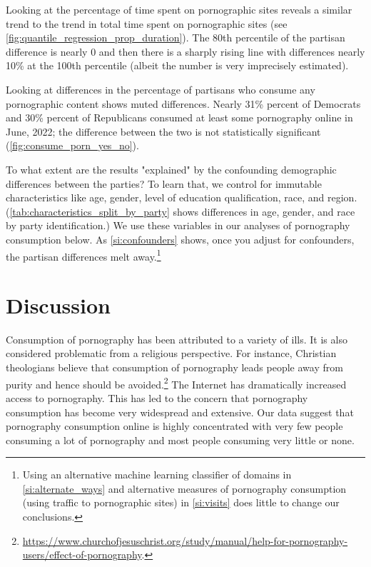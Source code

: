 \documentclass[12pt, letterpaper]{article}
\begin{document}
Looking at the percentage of time spent on pornographic sites reveals a similar trend to the trend in total time spent on pornographic sites (see \cref{fig:quantile_regression_prop_duration}). The 80th percentile of the partisan difference is nearly 0 and then there is a sharply rising line with differences nearly 10\% at the 100th percentile (albeit the number is very imprecisely estimated).

Looking at differences in the percentage of partisans who consume any pornographic content shows muted differences. Nearly 31\% percent of Democrats and 30\% percent of Republicans consumed at least some pornography online in June, 2022; the difference between the two is not statistically significant (\cref{fig:consume_porn_yes_no}). 

To what extent are the results "explained" by the confounding demographic differences between the parties? To learn that, we control for immutable characteristics like age, gender, level of education qualification, race, and region. (\cref{tab:characteristics_split_by_party} shows differences in age, gender, and race by party identification.) We use these variables in our analyses of pornography consumption below. As \cref{si:confounders} shows, once you adjust for confounders, the partisan differences melt away.\footnote{Using an alternative machine learning classifier of domains in \cref{si:alternate_ways} and alternative measures of pornography consumption (using traffic to pornographic sites) in \cref{si:visits} does little to change our conclusions.}


\section*{Discussion}\label{sec:discussion}
Consumption of pornography has been attributed to a variety of ills. It is also considered problematic from a religious perspective. For instance, Christian theologians believe that consumption of pornography leads people away from purity and hence should be avoided.\footnote{\url{https://www.churchofjesuschrist.org/study/manual/help-for-pornography-users/effect-of-pornography}.} The Internet has dramatically increased access to pornography. This has led to the concern that pornography consumption has become very widespread and extensive. Our data suggest that pornography consumption online is highly concentrated with very few people consuming a lot of pornography and most people consuming very little or none.
\end{document}

